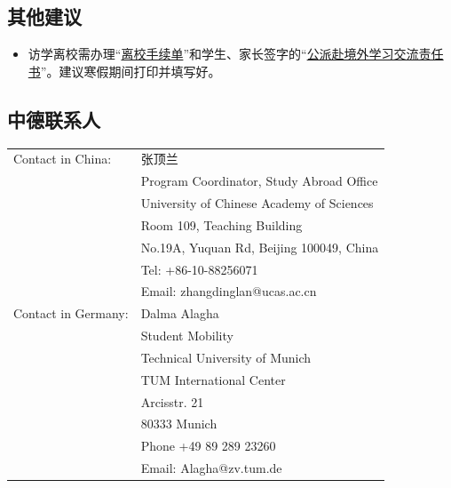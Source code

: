 \documentclass[oneside,final]{book}
\begin{document}
\section{其他建议}
\begin{itemize}
  \item 访学离校需办理“\href{http://bkjy.ucas.ac.cn/index.php/fxjl/download/3401-2017-06-13-03-47-14?task=down&fid=818}{离校手续单}”和学生、家长签字的“\href{http://bkjy.ucas.ac.cn/index.php/fxjl/download/3400-2017-06-13-03-46-26?task=down&fid=701}{公派赴境外学习交流责任书}”。建议寒假期间打印并填写好。
\end{itemize}

\begin{appendices}

\chapter{中德联系人}

\begin{table}[!htbp]
\centering
\label{tb:contacts}
\begin{tabular}{ll}
\toprule
Contact in China: & 张顶兰 \\
& Program Coordinator, Study Abroad Office \\
& University of Chinese Academy of Sciences \\
& Room 109, Teaching Building \\
& No.19A, Yuquan Rd, Beijing 100049, China \\
& Tel: +86-10-88256071 \\
& Email: zhangdinglan@ucas.ac.cn \\ \midrule
Contact in Germany: & Dalma Alagha \\
& Student Mobility \\
& Technical University of Munich\\
& TUM International Center \\
& Arcisstr. 21 \\
& 80333 Munich \\
& Phone +49 89 289 23260 \\
& Email: Alagha@zv.tum.de \\ \bottomrule
\end{tabular}
\end{table}


\end{appendices}
\end{document}
